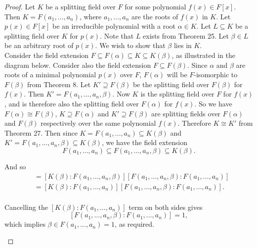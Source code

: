 \documentclass{article}
\begin{document}
  \begin{proof}
    Let $K$ be a splitting field over $F$ for some polynomial $f(x)\in
    F[x]$. Then $K=F(a_1,\ldots,a_n)$, where $a_1,\ldots,a_n$ are the roots
    of $f(x)$ in $K$. Let $p(x)\in F[x]$ be an irreducible polynomial with
    a root $\alpha\in K$. Let $L\subseteq K$ be a splitting field over $K$
    for $p(x)$. Note that $L$ exists from Theorem 25. Let $\beta\in L$ be
    an arbitrary root of $p(x)$. We wish to show that $\beta$ lies in
    $K$. \\

    Consider the field extension $F\subseteq F(\alpha) \subseteq K
    \subseteq K(\beta)$, as illustrated in the diagram below. Consider also
    the field extension $F\subseteq F(\beta)$. Since $\alpha$ and $\beta$
    are roots of a minimal polynomial $p(x)$ over $F$, $F(\alpha)$ will be
    $F$-isomorphic to $F(\beta)$ from Theorem 8. Let $K'\supseteq F(\beta)$
    be the splitting field over $F(\beta)$ for $f(x)$. Then
    $K'=F(a_1,\ldots,a_n,\beta)$. Now $K$ is the splitting field over $F$
    for $f(x)$, and is therefore also the splitting field over $F(\alpha)$
    for $f(x)$. So we have $F(\alpha)\cong F(\beta)$, $K\supseteq
    F(\alpha)$ and $K'\supseteq F(\beta)$ are splitting fields over
    $F(\alpha)$ and $F(\beta)$ respectively over the same polynomial
    $f(x)$. Therefore $K\cong K'$ from Theorem 27. Then since $K=
    F(a_1,\ldots,a_n)\subseteq K(\beta)$ and $K'=
    F(a_1,\ldots,a_n,\beta)\subseteq K(\beta)$, we have the field extension
    \[F(a_1,\ldots,a_n) \subseteq F(a_1,\ldots,a_n,\beta) \subseteq
    K(\beta).\]

    And so
    \begin{align*}
      [K(\beta):F(a_1,\ldots,a_n)] &=[K(\beta):F(a_1,\ldots,a_n,\beta)]
        [F(a_1,\ldots,a_n,\beta):F(a_1,\ldots,a_n)]\\
      &=[K(\beta):F(a_1,\ldots,a_n)]
        [F(a_1,\ldots,a_n,\beta):F(a_1,\ldots,a_n)].\\
    \end{align*}

    Cancelling the $[K(\beta):F(a_1,\ldots,a_n)]$ term on both sides gives
    \[[F(a_1,\ldots,a_n,\beta):F(a_1,\ldots,a_n)]=1,\]
    which implies $\beta\in F(a_1,\ldots,a_n)=1$, as required.

    \begin{center}
    \end{center}
  \end{proof}
\end{document}
